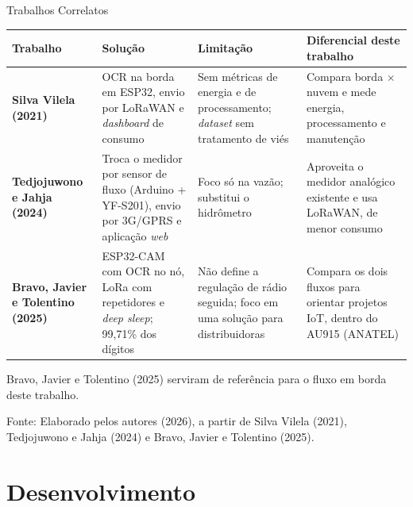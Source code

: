 \documentclass[
    aspectratio=169,
    11pt,
    brazil
]{beamer}
\newcommand{\fonteslide}[1]{\par\vfill{\tiny\color{black!60}#1\par}}
\begin{document}
\begin{frame}{Trabalhos Correlatos}
  \centering
  \scriptsize
  \renewcommand{\arraystretch}{1.35}
  \begin{tabular}{@{}>{\raggedright\arraybackslash}p{2.35cm}>{\raggedright\arraybackslash}p{3.7cm}>{\raggedright\arraybackslash}p{3.0cm}>{\raggedright\arraybackslash}p{3.9cm}@{}}
    \toprule
    \textbf{Trabalho} & \textbf{Solução} & \textbf{Limitação} & \textbf{Diferencial deste trabalho} \\
    \midrule
    \textbf{Silva Vilela (2021)} &
      OCR na borda em ESP32, envio por LoRaWAN e \textit{dashboard} de consumo &
      Sem métricas de energia e de processamento; \textit{dataset} sem tratamento de viés &
      Compara borda $\times$ nuvem e mede energia, processamento e manutenção \\
    \addlinespace
    \textbf{Tedjojuwono e Jahja (2024)} &
      Troca o medidor por sensor de fluxo (Arduino + YF-S201), envio por 3G/GPRS e aplicação \textit{web} &
      Foco só na vazão; substitui o hidrômetro &
      Aproveita o medidor analógico existente e usa LoRaWAN, de menor consumo \\
    \addlinespace
    \textbf{Bravo, Javier e Tolentino (2025)} &
      ESP32-CAM com OCR no nó, LoRa com repetidores e \textit{deep sleep}; 99,71\% dos dígitos &
      Não define a regulação de rádio seguida; foco em uma solução para distribuidoras &
      Compara os dois fluxos para orientar projetos IoT, dentro do AU915 (ANATEL) \\
    \bottomrule
  \end{tabular}
  \vspace{0.25cm}

  {\scriptsize Bravo, Javier e Tolentino (2025) serviram de referência para o fluxo em borda deste trabalho.}
  \fonteslide{Fonte: Elaborado pelos autores (2026), a partir de Silva Vilela (2021), Tedjojuwono e Jahja (2024) e Bravo, Javier e Tolentino (2025).}
\end{frame}

\section{Desenvolvimento}
\end{document}
